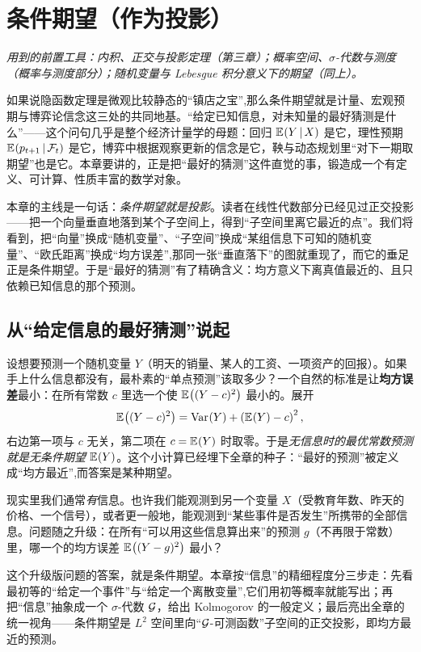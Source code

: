\chapter{条件期望（作为投影）}
\label{ch:condexp}

\noindent\emph{用到的前置工具：内积、正交与投影定理（第三章）；概率空间、$\sigma$-代数与测度（概率与测度部分）；随机变量与 Lebesgue 积分意义下的期望（同上）。}
\medskip

如果说隐函数定理是微观比较静态的``镇店之宝'',那么条件期望就是计量、宏观预期与博弈论信念这三处的共同地基。``给定已知信息，对未知量的最好猜测是什么''——这个问句几乎是整个经济计量学的母题：回归 $\mathbb{E}_{}\!\left(Y\,\middle|\, X\right)$ 是它，理性预期 $\mathbb{E}_{}\!\left(p_{t+1}\,\middle|\, \mathcal{F}_t\right)$ 是它，博弈中根据观察更新的信念是它，鞅与动态规划里``对下一期取期望''也是它。本章要讲的，正是把``最好的猜测''这件直觉的事，锻造成一个有定义、可计算、性质丰富的数学对象。

本章的主线是一句话：\emph{条件期望就是投影}。读者在线性代数部分已经见过正交投影——把一个向量垂直地落到某个子空间上，得到``子空间里离它最近的点''。我们将看到，把``向量''换成``随机变量''、``子空间''换成``某组信息下可知的随机变量''、``欧氏距离''换成``均方误差'',那同一张``垂直落下''的图就重现了，而它的垂足正是条件期望。于是``最好的猜测''有了精确含义：均方意义下离真值最近的、且只依赖已知信息的那个预测。

\section{从``给定信息的最好猜测''说起}
\label{sec:condexp-motivation}

设想要预测一个随机变量 $Y$（明天的销量、某人的工资、一项资产的回报）。如果手上什么信息都没有，最朴素的``单点预测''该取多少？一个自然的标准是让\textbf{均方误差}最小：在所有常数 $c$ 里选一个使 $\mathbb{E}_{}\!\left((Y-c)^2\right)$ 最小的。展开
\[
    \mathbb{E}_{}\!\left((Y-c)^2\right)=\operatorname{Var}_{}\!\left(Y\right)+\left(\mathbb{E}_{}\!\left(Y\right)-c\right)^2 ,
\]
右边第一项与 $c$ 无关，第二项在 $c=\mathbb{E}_{}\!\left(Y\right)$ 时取零。于是\emph{无信息时的最优常数预测就是无条件期望} $\mathbb{E}_{}\!\left(Y\right)$。这个小计算已经埋下全章的种子：``最好的预测''被定义成``均方最近'',而答案是某种期望。

现实里我们通常\emph{有}信息。也许我们能观测到另一个变量 $X$（受教育年数、昨天的价格、一个信号），或者更一般地，能观测到``某些事件是否发生''所携带的全部信息。问题随之升级：在所有``可以用这些信息算出来''的预测 $g$（不再限于常数）里，哪一个的均方误差 $\mathbb{E}_{}\!\left((Y-g)^2\right)$ 最小？

这个升级版问题的答案，就是条件期望。本章按``信息''的精细程度分三步走：先看最初等的``给定一个事件''与``给定一个离散变量'',它们用初等概率就能写出；再把``信息''抽象成一个 $\sigma$-代数 $\mathcal{G}$，给出 Kolmogorov 的一般定义；最后亮出全章的统一视角——条件期望是 $L^2$ 空间里向``$\mathcal{G}$-可测函数''子空间的正交投影，即均方最近的预测。

